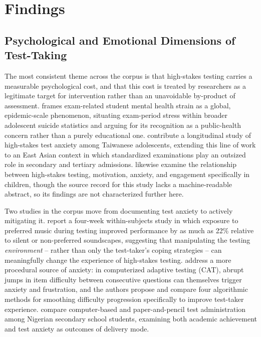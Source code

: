 \documentclass[11pt]{article}
\begin{document}
\section{Findings}

\subsection{Psychological and Emotional Dimensions of Test-Taking}

The most consistent theme across the corpus is that high-stakes testing carries a measurable psychological cost, and that this cost is treated by researchers as a legitimate target for intervention rather than an unavoidable by-product of assessment. \citet{george2024examstress} frames exam-related student mental health strain as a global, epidemic-scale phenomenon, situating exam-period stress within broader adolescent suicide statistics and arguing for its recognition as a public-health concern rather than a purely educational one. \citet{tseng2024taiwanese} contribute a longitudinal study of high-stakes test anxiety among Taiwanese adolescents, extending this line of work to an East Asian context in which standardized examinations play an outsized role in secondary and tertiary admissions. \citet{wallace2010motivation} likewise examine the relationship between high-stakes testing, motivation, anxiety, and engagement specifically in children, though the source record for this study lacks a machine-readable abstract, so its findings are not characterized further here.

Two studies in the corpus move from documenting test anxiety to actively mitigating it. \citet{amsberry2018sound} report a four-week within-subjects study in which exposure to preferred music during testing improved performance by as much as 22\% relative to silent or non-preferred soundscapes, suggesting that manipulating the testing \emph{environment} -- rather than only the test-taker's coping strategies -- can meaningfully change the experience of high-stakes testing. \citet{watson2026cat} address a more procedural source of anxiety: in computerized adaptive testing (CAT), abrupt jumps in item difficulty between consecutive questions can themselves trigger anxiety and frustration, and the authors propose and compare four algorithmic methods for smoothing difficulty progression specifically to improve test-taker experience. \citet{eleje2023cbtppt} compare computer-based and paper-and-pencil test administration among Nigerian secondary school students, examining both academic achievement and test anxiety as outcomes of delivery mode.
\end{document}

